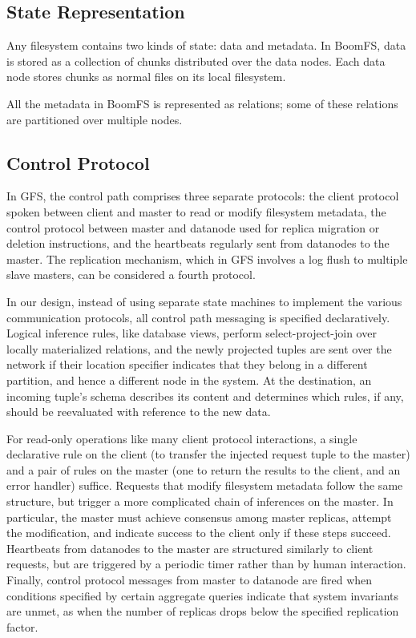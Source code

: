 \documentclass{article}
\begin{document}
\subsection{State Representation}
Any filesystem contains two kinds of state: data and metadata. In
BoomFS, data is stored as a collection of chunks distributed over the
data nodes. Each data node stores chunks as normal files on its
local filesystem.

All the metadata in BoomFS is represented as relations; some of these
relations are partitioned over multiple nodes.

\subsection{Control Protocol}
In GFS, the control path comprises three separate protocols: the client protocol spoken between client and master to read or modify filesystem metadata, the control protocol between master and datanode used for replica migration or deletion instructions, and the heartbeats regularly sent from datanodes to the master.  The replication mechanism, which in GFS involves a log flush to multiple slave masters, can be considered a fourth protocol.

In our design, instead of using separate state machines to implement the various communication protocols, all control path messaging is specified declaratively.  Logical inference rules, like database views, perform select-project-join over locally materialized relations, and the newly projected tuples are sent over the network if their location specifier indicates that they belong in a different partition, and hence a different node in the system.  At the destination, an incoming tuple's schema describes its content and determines which rules, if any, should be reevaluated with reference to the new data.

For read-only operations like many client protocol interactions, a single declarative rule on the client (to transfer the injected request tuple to the master) and a pair of rules on the master (one to return the results to the client, and an error handler) suffice.  Requests that modify filesystem metadata follow the same structure, but trigger a more complicated chain of inferences on the master.  In particular, the master must achieve consensus among master replicas, attempt the modification,  and indicate success to the client only if these steps succeed.  Heartbeats from datanodes to the master are structured similarly to client requests, but are triggered by a periodic timer rather than by human interaction.   Finally, control protocol messages from master to datanode are fired when conditions specified by certain aggregate queries indicate that system invariants are unmet, as when the number of replicas drops below the specified replication factor.  
\end{document}
